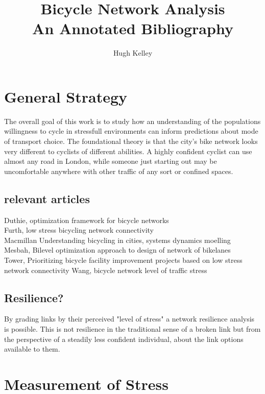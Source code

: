 \documentclass [12pt]{article}
\title{Bicycle Network Analysis\\\medskip An Annotated Bibliography}
\author{Hugh Kelley}
\begin{document}
\maketitle

\section{General Strategy}

The overall goal of this work is to study how an understanding of the populations willingness to cycle in stressfull environments can inform predictions about mode of transport choice. The foundational theory is that the city's bike network looks very different to cyclists of different abilities. A highly confident cyclist can use almost any road in London, while someone just starting out may be uncomfortable anywhere with other traffic of any sort or confined spaces. 

\subsection{relevant articles}

Duthie, optimization framework for bicycle networks
\cite{Duthie14}\\
Furth, low stress bicycling network connectivity
\cite{Furth16}\\
Macmillan Understanding bicycling in cities, systems dynamics moelling
\cite{Macmillan17}\\
Mesbah, Bilevel optimization approach to design of network of bikelanes
\cite{Mesbah12}\\
Tower, Prioritizing bicycle facility improvement projects based on low stress network connectivity
\cite{Tower14}
Wang, bicycle network level of traffic stress
\cite{Wang16}


\subsection{Resilience?}

By grading links by their perceived "level of stress" a network resilience analysis is possible. This is not resilience in the traditional sense of a broken link but from the perspective of a steadily less confident individual, about the link options available to them. 

\section{Measurement of Stress}
\end{document}
